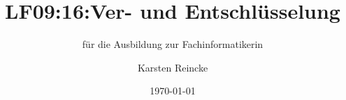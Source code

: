 \documentclass[]{beamer}
\title{LF09:16:Ver- und Entschlüsselung}
\subtitle{für die Ausbildung zur Fachinformatikerin}
\institute[GS-LDK]{Gewerbliche Schulen Dillenburg}
\author{Karsten Reincke}
\date{\today}
\def\cfgGl{../../../cfg.gl/}
\begin{document}

\begin{frame}
  \titlepage

  
\end{frame}






\logo{}
\newpage



%
\end{document}

